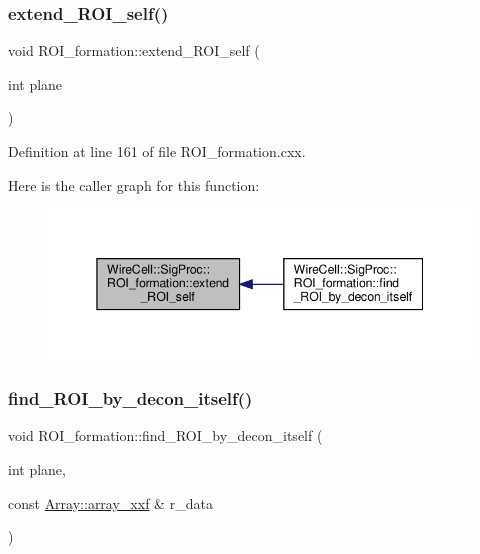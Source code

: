 \subsubsection{\texorpdfstring{extend\+\_\+\+R\+O\+I\+\_\+self()}{extend\_ROI\_self()}}
{\footnotesize\ttfamily void R\+O\+I\+\_\+formation\+::extend\+\_\+\+R\+O\+I\+\_\+self (\begin{DoxyParamCaption}\item[{int}]{plane }\end{DoxyParamCaption})}



Definition at line 161 of file R\+O\+I\+\_\+formation.\+cxx.

Here is the caller graph for this function\+:
\nopagebreak
\begin{figure}[H]
\begin{center}
\leavevmode
\includegraphics[width=345pt]{class_wire_cell_1_1_sig_proc_1_1_r_o_i__formation_a3d677e7421cc9da9a878d9e5528c9b2a_icgraph}
\end{center}
\end{figure}
\mbox{\label{class_wire_cell_1_1_sig_proc_1_1_r_o_i__formation_a4b9d583a94364252b8ef97742edfc21f}} 
\subsubsection{\texorpdfstring{find\+\_\+\+R\+O\+I\+\_\+by\+\_\+decon\+\_\+itself()}{find\_ROI\_by\_decon\_itself()}\hspace{0.1cm}{\footnotesize\ttfamily [1/2]}}
{\footnotesize\ttfamily void R\+O\+I\+\_\+formation\+::find\+\_\+\+R\+O\+I\+\_\+by\+\_\+decon\+\_\+itself (\begin{DoxyParamCaption}\item[{int}]{plane,  }\item[{const \hyperlink{namespace_wire_cell_1_1_array_ab565fef5e33632bb02f0ed4be803020c}{Array\+::array\+\_\+xxf} \&}]{r\+\_\+data }\end{DoxyParamCaption})}



